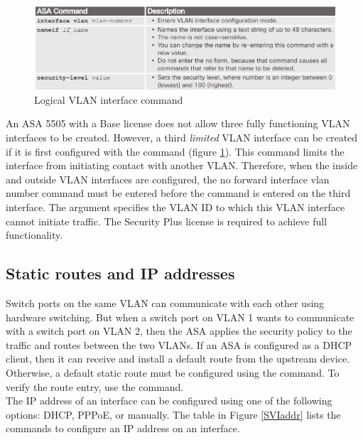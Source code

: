 \begin{figure}[hbtp]
\caption{Logical VLAN interface command}\label{ASAlogicalVLAN}
\centering
\includegraphics[scale=0.5]{pictures/ASAlogicalVLAN.PNG}
\end{figure}


An ASA 5505 with a Base license does not allow three fully functioning VLAN interfaces to be created. However, a third  \emph{limited} VLAN interface can be created if it is first configured with the  command (figure \ref{ASAlogicalVLAN}). This command limits the interface from initiating contact with another VLAN. Therefore, when the inside and outside VLAN interfaces are configured, the no forward interface vlan number command must be entered before the  command is entered on the third interface. The  argument specifies the VLAN ID to which this VLAN interface cannot initiate traffic. The Security Plus license is required to achieve full functionality.\\

\subsection{Static routes and IP addresses}

Switch ports on the same VLAN can communicate with each other using hardware switching. But when a switch port on VLAN 1 wants to communicate with a switch port on VLAN 2, then the ASA applies the security policy to the traffic and routes between the two VLANs. If an ASA is configured as a DHCP client, then it can receive and install a default route from the upstream device. Otherwise, a default static route must be configured using the  command. To verify the route entry, use the  command.\\

The IP address of an interface can be configured using one of the following options: DHCP, PPPoE, or manually. The table in Figure \ref{SVIaddr} lists the commands to configure an IP address on an interface. 

